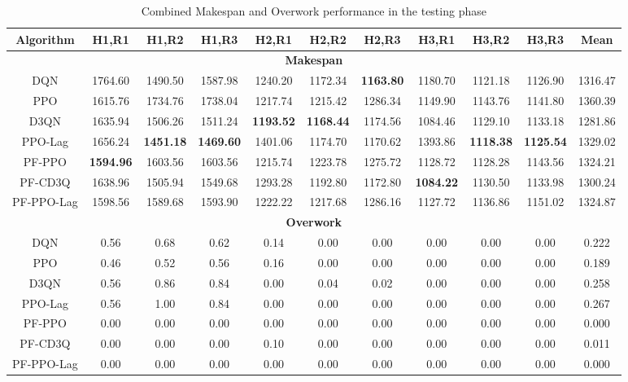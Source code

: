 \begin{table*}[htbp]
\centering
\caption{Combined Makespan and Overwork performance in the testing phase}\label{tab:combined}
\begin{tabular}{ccccccccccc}
\hline
Algorithm & H1,R1 & H1,R2 & H1,R3 & H2,R1 & H2,R2 & H2,R3 & H3,R1 & H3,R2 & H3,R3 & Mean \\
\hline
\multicolumn{11}{c}{\textbf{Makespan}} \\
\hline
DQN & 1764.60 & 1490.50 & 1587.98 & 1240.20 & 1172.34 & \textbf{1163.80} & 1180.70 & 1121.18 & 1126.90 & 1316.47 \\
PPO & 1615.76 & 1734.76 & 1738.04 & 1217.74 & 1215.42 & 1286.34 & 1149.90 & 1143.76 & 1141.80 & 1360.39 \\
D3QN & 1635.94 & 1506.26 & 1511.24 & \textbf{1193.52} & \textbf{1168.44} & 1174.56 & 1084.46 & 1129.10 & 1133.18 & 1281.86 \\
PPO-Lag & 1656.24 & \textbf{1451.18} & \textbf{1469.60} & 1401.06 & 1174.70 & 1170.62 & 1393.86 & \textbf{1118.38} & \textbf{1125.54} & 1329.02 \\
PF-PPO & \textbf{1594.96} & 1603.56 & 1603.56 & 1215.74 & 1223.78 & 1275.72 & 1128.72 & 1128.28 & 1143.56 & 1324.21 \\
PF-CD3Q & 1638.96 & 1505.94 & 1549.68 & 1293.28 & 1192.80 & 1172.80 & \textbf{1084.22} & 1130.50 & 1133.98 & 1300.24 \\
PF-PPO-Lag & 1598.56 & 1589.68 & 1593.90 & 1222.22 & 1217.68 & 1286.16 & 1127.72 & 1136.86 & 1151.02 & 1324.87 \\
\hline
\multicolumn{11}{c}{\textbf{Overwork}} \\
\hline
DQN & 0.56 & 0.68 & 0.62 & 0.14 & 0.00 & 0.00 & 0.00 & 0.00 & 0.00 & 0.222 \\
PPO & 0.46 & 0.52 & 0.56 & 0.16 & 0.00 & 0.00 & 0.00 & 0.00 & 0.00 & 0.189 \\
D3QN & 0.56 & 0.86 & 0.84 & 0.00 & 0.04 & 0.02 & 0.00 & 0.00 & 0.00 & 0.258 \\
PPO-Lag & 0.56 & 1.00 & 0.84 & 0.00 & 0.00 & 0.00 & 0.00 & 0.00 & 0.00 & 0.267 \\
PF-PPO & 0.00 & 0.00 & 0.00 & 0.00 & 0.00 & 0.00 & 0.00 & 0.00 & 0.00 & 0.000 \\
PF-CD3Q & 0.00 & 0.00 & 0.00 & 0.10 & 0.00 & 0.00 & 0.00 & 0.00 & 0.00 & 0.011 \\
PF-PPO-Lag & 0.00 & 0.00 & 0.00 & 0.00 & 0.00 & 0.00 & 0.00 & 0.00 & 0.00 & 0.000 \\
\hline
\end{tabular}
\end{table*}
